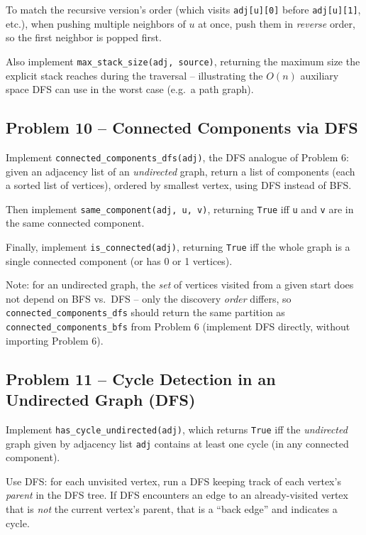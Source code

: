 \documentclass[11pt]{article}
\begin{document}
To match the recursive version's order (which visits \texttt{adj[u][0]} before
\texttt{adj[u][1]}, etc.), when pushing multiple neighbors of $u$ at once, push them in
\emph{reverse} order, so the first neighbor is popped first.

Also implement \texttt{max\_stack\_size(adj, source)}, returning the maximum size the
explicit stack reaches during the traversal -- illustrating the $O(n)$ auxiliary space
DFS can use in the worst case (e.g.\ a path graph).

\subsection*{Problem 10 -- Connected Components via DFS}

Implement \texttt{connected\_components\_dfs(adj)}, the DFS analogue of Problem 6: given
an adjacency list of an \emph{undirected} graph, return a list of components (each a
sorted list of vertices), ordered by smallest vertex, using DFS instead of BFS.

Then implement \texttt{same\_component(adj, u, v)}, returning \texttt{True} iff \texttt{u}
and \texttt{v} are in the same connected component.

Finally, implement \texttt{is\_connected(adj)}, returning \texttt{True} iff the whole
graph is a single connected component (or has 0 or 1 vertices).

Note: for an undirected graph, the \emph{set} of vertices visited from a given start does
not depend on BFS vs.\ DFS -- only the discovery \emph{order} differs, so
\texttt{connected\_components\_dfs} should return the same partition as
\texttt{connected\_components\_bfs} from Problem 6 (implement DFS directly, without
importing Problem 6).

\subsection*{Problem 11 -- Cycle Detection in an Undirected Graph (DFS)}

Implement \texttt{has\_cycle\_undirected(adj)}, which returns \texttt{True} iff the
\emph{undirected} graph given by adjacency list \texttt{adj} contains at least one cycle
(in any connected component).

Use DFS: for each unvisited vertex, run a DFS keeping track of each vertex's
\emph{parent} in the DFS tree. If DFS encounters an edge to an already-visited vertex
that is \emph{not} the current vertex's parent, that is a ``back edge'' and indicates a
cycle.
\end{document}
